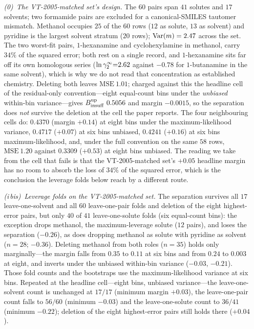 \emph{(0)~The VT-2005-matched set's design.} The $60$ pairs span $41$ solutes and $17$ solvents; two
formamide pairs are excluded for a canonical-SMILES tautomer mismatch. Methanol occupies $25$ of the
$60$ rows ($12$ as solute, $13$ as solvent) and pyridine is the largest solvent stratum ($20$ rows);
$\mathrm{Var}(m)=2.47$ across the set.
The two worst-fit pairs, $1$-hexanamine and cyclohexylamine in methanol, carry $34\%$ of the squared
error; both rest on a single record, and $1$-hexanamine sits far off its own homologous series
($\ln\gamma_2^\infty{=}2.62$ against $-0.78$ for $1$-butanamine in the same solvent), which is why we do not read
that concentration as established chemistry. Deleting both leaves $\mathrm{MSE}\ 1.01$; charged
against this the headline cell of the residual-only convention---eight equal-count bins under the
\emph{unbiased} within-bin variance---gives $\Binsuf^{\mathrm{up}}\ 0.5056$ and margin $-0.0015$, so
the separation does \emph{not} survive the deletion at the cell the paper reports. The four
neighbouring cells do: $0.4370$ (margin $+0.14$) at eight bins under the maximum-likelihood variance,
$0.4717$ ($+0.07$) at six bins unbiased, $0.4241$ ($+0.16$) at six bins maximum-likelihood, and, under
the full convention on the same $58$ rows, $\mathrm{MSE}\ 1.20$ against $0.3309$ ($+0.53$) at eight
bins unbiased. The reading we take from the cell that fails is that the VT-2005-matched set's $+0.05$ headline
margin has no room to absorb the loss of $34\%$ of the squared error, which is the conclusion the
leverage folds below reach by a different route.

\emph{(i\,bis)~Leverage folds on the VT-2005-matched set.} The separation survives all $17$ leave-one-solvent and
all $60$ leave-one-pair folds and deletion of the eight highest-error pairs, but only $40$ of $41$
leave-one-solute folds (six equal-count bins): the exception drops methanol, the maximum-leverage
solute ($12$ pairs), and loses the separation ($-0.26$), as does dropping methanol as solute with
pyridine as solvent ($n{=}28$; $-0.36$). Deleting methanol from both roles ($n{=}35$) holds only
marginally---the margin falls from $0.35$ to $0.11$ at six bins and from $0.24$ to $0.003$ at eight,
and inverts under the unbiased within-bin variance ($-0.03$, $-0.21$). Those fold counts and the
bootstraps use the maximum-likelihood variance at six bins. Repeated at the headline cell---eight
bins, unbiased variance---the leave-one-solvent count is unchanged at $17/17$ (minimum margin
$+0.03$), the leave-one-pair count falls to $56/60$ (minimum $-0.03$) and the leave-one-solute count
to $36/41$ (minimum $-0.22$); deletion of the eight highest-error pairs still holds there ($+0.04$).

